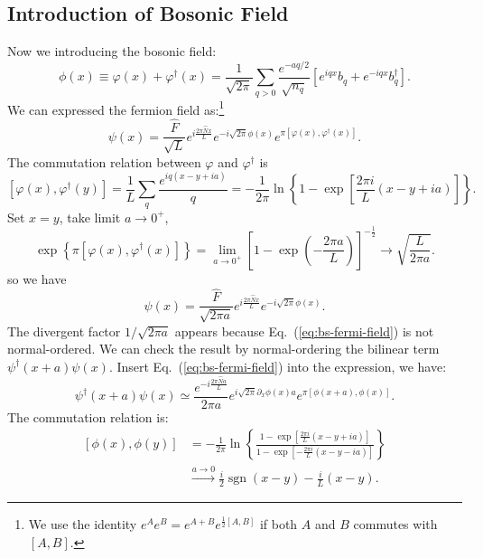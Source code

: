 \documentclass[aps,prb,superscriptaddress,nofootinbib]{revtex4}
\begin{document}
\subsection{Introduction of Bosonic Field}
Now we introducing the bosonic field:
\begin{equation}
	\phi(x) \equiv \varphi(x)+\varphi^{\dagger}(x)
	= \frac{1}{\sqrt{2\pi}} \sum_{q>0} \frac{e^{-a q/2}}{\sqrt{n_q}} \left[e^{i q x} b_{q}+e^{-i q x} b_{q}^{\dagger}\right].
\end{equation}
We can expressed the fermion field as:\footnote{We use the identity $e^A e^B = e^{A+B}e^{\frac{1}{2}[A,B]}$ if both $A$ and $B$ commutes with $[A,B]$.}
\begin{equation*}
	\psi(x) = \frac{\hat{F}}{\sqrt{L}} e^{i\frac{2\pi \hat N x}{L}} e^{-i\sqrt{2\pi}\phi(x)}
	e^{\pi[\varphi(x),\varphi^\dagger(x)]}.
\end{equation*}
The commutation relation between $\varphi$ and $\varphi^\dagger$ is
\begin{equation*}
	\left[\varphi(x),\varphi^\dagger(y)\right]
	= \frac{1}{L} \sum_q \frac{e^{iq(x-y+ia)}}{q} 
	= -\frac{1}{2\pi}\ln\left\{ 1-\exp\left[\frac{2\pi i}{L}(x-y+ia)\right]\right\}.
\end{equation*}
Set $x=y$, take limit $a\rightarrow 0^+$,
\begin{equation*}
	\exp\left\{\pi[\varphi(x),\varphi^\dagger(x)] \right\} = \lim_{a\rightarrow0^+} \left[1-\exp\left(-\frac{2\pi a}{L}\right)\right]^{-\frac{1}{2}}
	\rightarrow \sqrt{\frac{L}{2\pi a}}.
\end{equation*}
so we have
\begin{equation}\label{eq:bs-fermi-field}
	\psi(x) = \frac{\hat{F}}{\sqrt{2\pi a}}e^{i\frac{2\pi\hat N x}{L}}e^{-i\sqrt{2\pi}\phi(x)}.
\end{equation}
The divergent factor $1/\sqrt{2\pi a}$ appears because Eq.~(\ref{eq:bs-fermi-field}) is not normal-ordered.
We can check the result by normal-ordering the bilinear term $\psi^\dagger(x+a)\psi(x)$.
Insert Eq.~(\ref{eq:bs-fermi-field}) into the expression, we have:
\begin{equation}
	\psi^\dagger(x+a)\psi(x)
	\simeq \frac{e^{-i\frac{2\pi\hat N a}{L}}}{2\pi a}
	e^{i\sqrt{2\pi}\partial_x\phi(x)  a} 
	e^{\pi[\phi(x+ a),\phi(x)]}.
\end{equation}
The commutation relation is:
\begin{equation}
\begin{aligned}
	\left[\phi(x),\phi(y)\right] 
	&= -\frac{1}{2\pi}\ln \left\{\frac{1-\exp \left[\frac{2 \pi i}{L}(x-y+i  a)\right]}{1-\exp \left[-\frac{2 \pi i}{L}(x-y-i  a)\right]}\right\} \\
	&\stackrel{ a \rightarrow 0}{\longrightarrow} 
		\frac{i}{2} \operatorname{sgn}(x-y)-\frac{i}{L}(x-y).
\end{aligned}
\end{equation}
\end{document}

